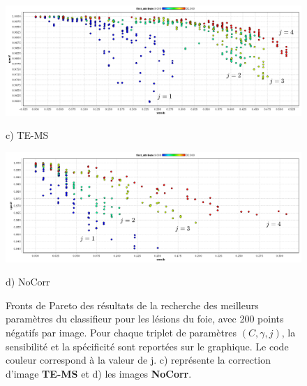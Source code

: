 \begin{figure}[h!]

\begin{center}
\includegraphics[width=14cm]{images/pareto_mod_LOR19}
 
{\small c) TE-MS}
\vspace{0.5cm}

\includegraphics[width=14cm]{images/pareto_mod_NoCorr19}

{\small d) NoCorr}

\end{center}
 \caption[(2/2) Fronts de Pareto des résultats de la recherche des meilleurs paramètres du classifieur pour les lésions du foie]{Fronts de Pareto des résultats de la recherche des meilleurs paramètres du classifieur pour les lésions du foie, avec 200 points négatifs par image. Pour chaque triplet de paramètres $(C, \gamma, j)$, la sensibilité et la spécificité sont reportées sur le graphique. Le code couleur correspond à la valeur de j. c) représente la correction d'image \textbf{TE-MS} et d) les images \textbf{NoCorr}.}
\label{fig:paretoModalite19_2} 
\end{figure}


